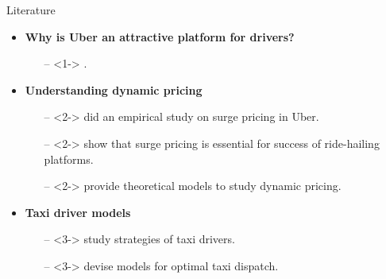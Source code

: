 \begin{frame}{Literature}
\begin{itemize}
    \item<1->\textcolor{BlueGreen}{\bf Why is Uber an attractive platform for drivers?}
        \begin{itemize}
            \item[--]<1-> \textcite{chen2016dynamic,hall2016analysis}.
        \end{itemize}
        \vspace{0.3cm}
    \item<2->\textcolor{BlueGreen}{\bf Understanding dynamic pricing}
        \begin{itemize}
        	\item[--]<2-> \textcite{chen2015peeking} did an empirical study on surge pricing in Uber.
        	\item[--]<2-> \textcite{castillo2017surge} show that surge pricing is essential for success of ride-hailing platforms.
            \item[--]<2-> \textcite{banerjee2015pricing,ma2018spatio,bimpikis2016spatial} provide theoretical models to study dynamic pricing. 
        \end{itemize}
        \vspace{0.3cm}
    \item<3->\textcolor{BlueGreen}{\bf Taxi driver models}
        \begin{itemize}
            \item[--]<3-> \textcite{camerer1997labor} study strategies of taxi drivers.
            \item[--]<3-> \textcite{zhang2017taxi} devise models for optimal taxi dispatch. 
        \end{itemize}
\end{itemize}
\begin{center}
\end{center}
\end{frame}